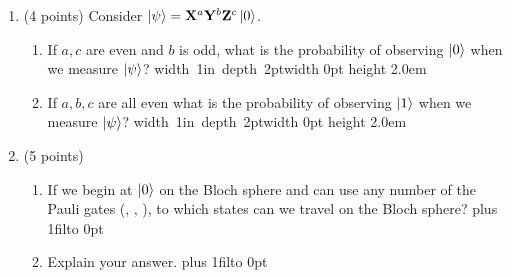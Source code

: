 \documentclass[12pt]{article}
\newcommand{\Blank}{\mbox{\hskip 4pt\vrule width 1in depth 2pt}\vrule width 0pt height 2.0em}
\def\DefaultSpace{1in}
\newcommand{\LeaveSpace}[1][\DefaultSpace]{%
\vskip #1 plus 1fil\relax\hbox to 0pt{\hss} %
}
\begin{document}
\begin{enumerate}[font=\bfseries]
    \item (4 points) Consider $\ket{\psi} = \mathbf{X}^a\mathbf{Y}^b\mathbf{Z}^c\ket{0}$.
    \begin{enumerate}[label=\theenumi.\arabic*]
        \item If $a,c$ are even and $b$ is odd, what is the probability of observing $\ket{0}$ when we measure $\ket{\psi}$? \Blank{}
        \item If $a,b,c$ are all even what is the probability of observing $\ket{1}$ when we measure $\ket{\psi}$? \Blank{}
    \end{enumerate}
    \item (5 points) 
    \begin{enumerate}[label=\theenumi.\arabic*] \item If we begin at $\ket{0}$ on the Bloch sphere and can use any number of the Pauli gates (\PauliX{}, \PauliY{}, \PauliZ{}), to which states can we travel on the Bloch sphere? \LeaveSpace{}
    \item Explain your answer. 
    \LeaveSpace{}
    

\end{enumerate}
\end{enumerate}
\end{document}

